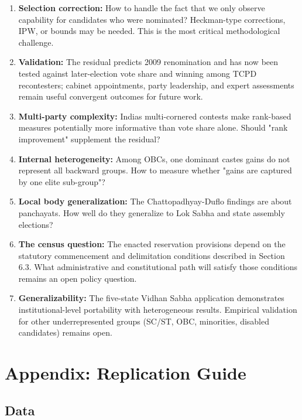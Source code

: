 \documentclass[
]{article}
\begin{document}
\begin{enumerate}
\def\labelenumi{\arabic{enumi}.}
\item
  \textbf{Selection correction:} How to handle the fact that we only observe capability for candidates who were nominated? Heckman-type corrections, IPW, or bounds may be needed. This is the most critical methodological challenge.
\item
  \textbf{Validation:} The residual predicts 2009 renomination and has now been tested against later-election vote share and winning among TCPD recontesters; cabinet appointments, party leadership, and expert assessments remain useful convergent outcomes for future work.
\item
  \textbf{Multi-party complexity:} India\textquotesingle s multi-cornered contests make rank-based measures potentially more informative than vote share alone. Should "rank improvement" supplement the residual?
\item
  \textbf{Internal heterogeneity:} Among OBCs, one dominant caste\textquotesingle s gains do not represent all backward groups. How to measure whether "gains are captured by one elite sub-group"?
\item
  \textbf{Local body generalization:} The Chattopadhyay-Duflo findings are about panchayats. How well do they generalize to Lok Sabha and state assembly elections?
\item
  \textbf{The census question:} The enacted reservation provisions depend on the statutory commencement and delimitation conditions described in Section 6.3. What administrative and constitutional path will satisfy those conditions remains an open policy question.
\item
  \textbf{Generalizability:} The five-state Vidhan Sabha application demonstrates institutional-level portability with heterogeneous results. Empirical validation for other underrepresented groups (SC/ST, OBC, minorities, disabled candidates) remains open.
\end{enumerate}



\section{Appendix: Replication Guide}\label{appendix-replication-guide}

\subsection{Data}\label{data}
\end{document}

